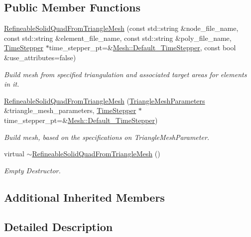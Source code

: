 \subsection*{Public Member Functions}
\begin{DoxyCompactItemize}
\item 
\hyperlink{classoomph_1_1RefineableSolidQuadFromTriangleMesh_add069deb878fe3142334acac0c2d86af}{Refineable\+Solid\+Quad\+From\+Triangle\+Mesh} (const std\+::string \&node\+\_\+file\+\_\+name, const std\+::string \&element\+\_\+file\+\_\+name, const std\+::string \&poly\+\_\+file\+\_\+name, \hyperlink{classoomph_1_1TimeStepper}{Time\+Stepper} $\ast$time\+\_\+stepper\+\_\+pt=\&\hyperlink{classoomph_1_1Mesh_a12243d0fee2b1fcee729ee5a4777ea10}{Mesh\+::\+Default\+\_\+\+Time\+Stepper}, const bool \&use\+\_\+attributes=false)
\begin{DoxyCompactList}\small\item\em Build mesh from specified triangulation and associated target areas for elements in it. \end{DoxyCompactList}\item 
\hyperlink{classoomph_1_1RefineableSolidQuadFromTriangleMesh_a2c73a5df8ad33217f0978417e9d6c690}{Refineable\+Solid\+Quad\+From\+Triangle\+Mesh} (\hyperlink{classoomph_1_1TriangleMeshParameters}{Triangle\+Mesh\+Parameters} \&triangle\+\_\+mesh\+\_\+parameters, \hyperlink{classoomph_1_1TimeStepper}{Time\+Stepper} $\ast$time\+\_\+stepper\+\_\+pt=\&\hyperlink{classoomph_1_1Mesh_a12243d0fee2b1fcee729ee5a4777ea10}{Mesh\+::\+Default\+\_\+\+Time\+Stepper})
\begin{DoxyCompactList}\small\item\em Build mesh, based on the specifications on Triangle\+Mesh\+Parameter. \end{DoxyCompactList}\item 
virtual \hyperlink{classoomph_1_1RefineableSolidQuadFromTriangleMesh_a2b6bc173d4ef48f285f9cf7330db2878}{$\sim$\+Refineable\+Solid\+Quad\+From\+Triangle\+Mesh} ()
\begin{DoxyCompactList}\small\item\em Empty Destructor. \end{DoxyCompactList}\end{DoxyCompactItemize}
\subsection*{Additional Inherited Members}


\subsection{Detailed Description}
